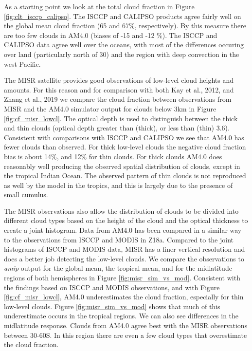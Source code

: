 \documentclass[draft]{agujournal2019}
\begin{document}
As a starting point we look at the total cloud fraction in Figure \ref{fig:clt_isccp_calipso}.  The ISCCP and 
CALIPSO products agree fairly well on the 
global mean cloud fraction (65 and 67\%, respectively).   By this measure there are too few clouds in AM4.0 
(biases of -15 and -12 \%).   The ISCCP and CALIPSO data agree well over the oceans, with most of the differences
occuring over land (particularly north of 30) and the region with deep convection in the west Pacific.    


The MISR satellite provides good observations of low-level cloud heights and amounts.  
For this reason and for comparison with both Kay et al., 2012, and Zhang et al., 2019 we compare the cloud fraction 
between observations from MISR and the AM4.0 simulator output for clouds below 3km in Figure \ref{fig:cf_misr_lowcl}.  
The optical depth is used to distinguish between the thick and thin clouds (optical depth greater than (thick), or less than (thin) 3.6).  
Consistent with comparisons with ISCCP and CALIPSO we see that AM4.0 has fewer clouds than observed.
For thick low-level clouds the negative cloud fraction bias is about 14\%, and 12\% for thin clouds.   
For thick clouds AM4.0 does reasonably well producing the observed spatial distribution of clouds, except in the tropical Indian Ocean. 
The observed pattern of thin clouds is not reproduced as well by the model in the tropics, and this is largely due to the 
presence of small cumulus. 

The MISR observations also allow the distribution of clouds to be divided into different cloud types based on the height of the cloud and
the optical thickness to create a joint histogram.  
Data from AM4.0 has been compared in a similar way to the observations from ISCCP and MODIS in Z18a.  
Compared to the joint histograms of ISCCP and MODIS data, MISR has a finer
vertical resolution and does a better job detecting the low-level clouds.  We compare the observations to 
\textit{amip} output for the global mean, the tropical mean, and for the midlatitude regions of both hemispheres 
in Figure \ref{fig:misr_sim_vs_mod}.
Consistent with the findings based on ISCCP and MODIS observations, and with Figure \ref{fig:cf_misr_lowcl},
AM4.0 underestimates the cloud fraction, especially for thin low-level clouds.  Figure \ref{fig:misr_sim_vs_mod}
shows that much of this underestimate occurs in the tropical regions.  We can also see differences in the
midlatitude response.  Clouds from AM4.0 agree best with the MISR observations between 30-60S.  In this 
region there are even a few cloud types that overestimate the cloud fraction.  
\end{document}
